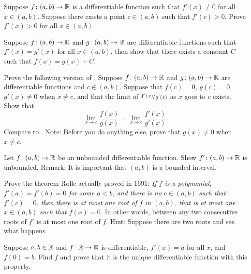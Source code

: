 \begin{exercise}
Suppose $f \colon (a,b) \to {\mathbb{R}}$ is a differentiable function
such that
$f'(x) \neq 0$ for all $x \in (a,b)$.  Suppose there
exists
a point $c \in (a,b)$ such that $f'(c) > 0$.
Prove $f'(x) > 0$ for all $x \in (a,b)$.
\end{exercise}

\begin{exercise} \label{exercise:samediffconst}
Suppose $f \colon (a,b) \to {\mathbb{R}}$ and $g \colon (a,b) \to {\mathbb{R}}$ are
differentiable functions such that $f'(x) = g'(x)$ for all $x \in (a,b)$,
then show that there exists a constant $C$ such that $f(x) = g(x) + C$.
\end{exercise}

\begin{exercise}
Prove the following version of .
Suppose 
$f \colon (a,b) \to {\mathbb{R}}$ and $g \colon (a,b) \to {\mathbb{R}}$ are differentiable
functions and $c \in (a,b)$.  Suppose that $f(c) = 0$, $g(c)=0$,
$g'(x) \neq 0$ when $x \neq c$, and
that the limit of $\nicefrac{f'(x)}{g'(x)}$ as $x$ goes to $c$ exists.  Show that
\begin{equation*}
\lim_{x \to c} \frac{f(x)}{g(x)} = 
\lim_{x \to c} \frac{f'(x)}{g'(x)} .
\end{equation*}
Compare to .
Note: Before you do anything else, prove that $g(x) \neq 0$ when $x \neq c$.
\end{exercise}

\begin{exercise}
Let $f \colon (a,b) \to {\mathbb{R}}$ be an unbounded differentiable function.  Show
$f' \colon (a,b) \to {\mathbb{R}}$ is unbounded.
Remark: It is important that $(a,b)$ is a bounded interval.
\end{exercise}

\begin{exercise}
Prove the theorem Rolle actually proved in 1691:
\emph{If $f$ is a polynomial,
$f'(a) = f'(b) = 0$ for some $a < b$,
and there is no $c \in (a,b)$ such that $f'(c) = 0$,
then there is at most one root of $f$ in $(a,b)$,
that is at most one $x \in (a,b)$ such that $f(x) = 0$.}
In other words, between any two consecutive roots of $f'$ is at most one
root of $f$.
Hint: Suppose there are two roots and see what happens.
\end{exercise}

\begin{exercise}
Suppose $a,b \in {\mathbb{R}}$ and $f \colon {\mathbb{R}} \to {\mathbb{R}}$ is differentiable,
$f'(x) = a$ for all $x$, and $f(0) = b$.  Find $f$ and prove that 
it is the unique differentiable function with this property.
\end{exercise}

